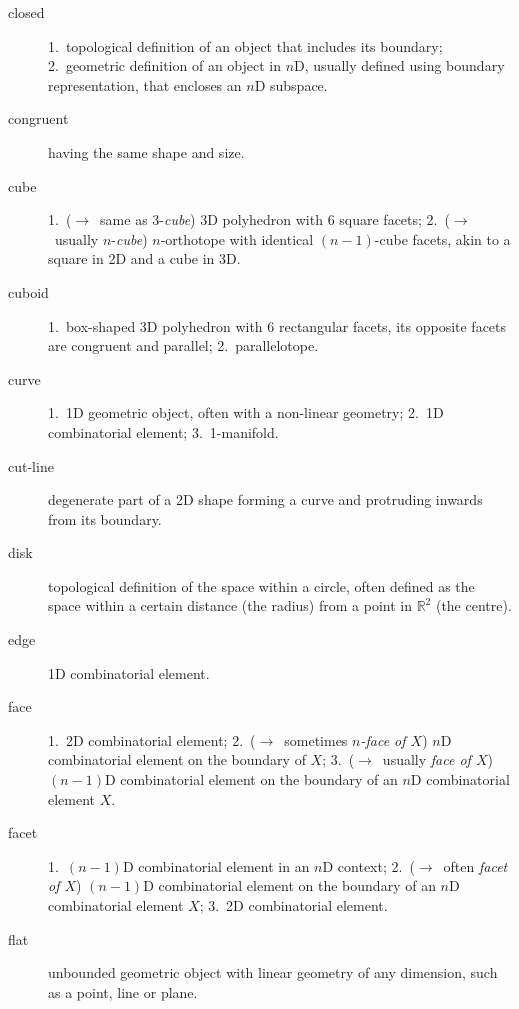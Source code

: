 \begin{multicols}{2}
\begin{description}
\item[closed]
1.\ topological definition of an object that includes its boundary;
2.\ geometric definition of an object in $n$D, usually defined using boundary representation, that encloses an $n$D subspace.

\item[congruent]
having the same shape and size.

\item[cube]
1.\ ($\rightarrow$\ same as $3$-\emph{cube}) 3D polyhedron with 6 square facets;
2.\ ($\rightarrow$\ usually $n$-\emph{cube}) $n$-orthotope with identical $(n-1)$-cube facets, akin to a square in 2D and a cube in 3D.

\item[cuboid]
1.\ box-shaped 3D polyhedron with 6 rectangular facets, its opposite facets are congruent and parallel;
{\color{gray} 2.\ parallelotope}.

\item[curve]
1.\ 1D geometric object, often with a non-linear geometry;
2.\ 1D combinatorial element;
3.\ 1-manifold.

\item[cut-line]
degenerate part of a 2D shape forming a curve and protruding inwards from its boundary.

\item[disk]
topological definition of the space within a circle, often defined as the space within a certain distance (the radius) from a point in $\mathbb{R}^2$ (the centre).

\item[edge]
1D combinatorial element.

\item[face]
1.\ 2D combinatorial element;
2.\ ($\rightarrow$\ sometimes \emph{$n$-face of $X$}) $n$D combinatorial element on the boundary of $X$;
{\color{gray} 3.\ ($\rightarrow$\ usually \emph{face of $X$}) $(n-1)$D combinatorial element on the boundary of an $n$D combinatorial element $X$}.

\item[facet]
1.\ $(n-1)$D combinatorial element in an $n$D context;
2.\ ($\rightarrow$\ often \emph{facet of $X$}) $(n-1)$D combinatorial element on the boundary of an $n$D combinatorial element $X$;
{\color{gray} 3.\ 2D combinatorial element}.

\item[flat]
unbounded geometric object with linear geometry of any dimension, such as a point, line or plane.


\end{description}
\end{multicols}
